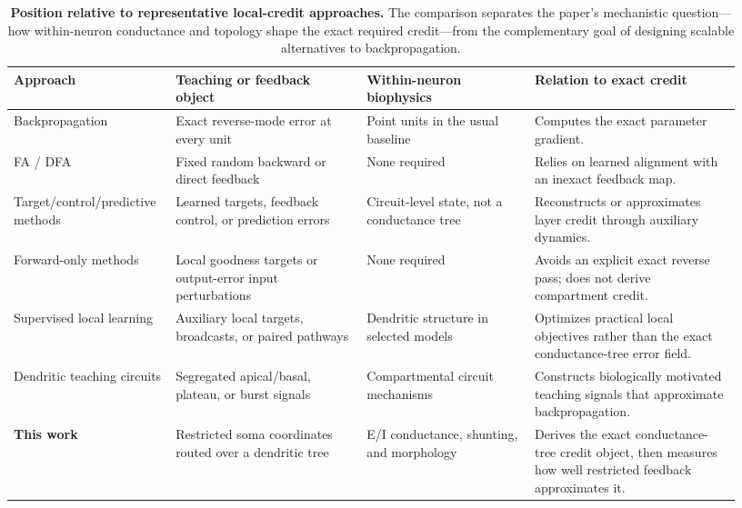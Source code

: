     \begin{table}[htbp]
    \centering
    \scriptsize
    \setlength{\tabcolsep}{2.5pt}
    \renewcommand{\arraystretch}{1.05}
    \begin{tabular}{@{}L{0.19\linewidth}L{0.25\linewidth}L{0.22\linewidth}L{0.27\linewidth}@{}}
    \toprule
    \textbf{Approach} & \textbf{Teaching or feedback object} & \textbf{Within-neuron biophysics} & \textbf{Relation to exact credit} \\
    \midrule
    Backpropagation \cite{rumelhart1986learning} & Exact reverse-mode error at every unit & Point units in the usual baseline & Computes the exact parameter gradient. \\
    FA / DFA \cite{lillicrap2016random,nokland2016dfa} & Fixed random backward or direct feedback & None required & Relies on learned alignment with an inexact feedback map. \\
    Target/control/predictive methods \cite{lee2015dtp,meulemans2021dfc,millidge2021predictive} & Learned targets, feedback control, or prediction errors & Circuit-level state, not a conductance tree & Reconstructs or approximates layer credit through auxiliary dynamics. \\
    Forward-only methods \cite{hinton2022forward,dellaferrera2022pepita} & Local goodness targets or output-error input perturbations & None required & Avoids an explicit exact reverse pass; does not derive compartment credit. \\
    Supervised local learning \cite{ma2024auglocal,lv2025dll,erdogan2025ebd,kao2024ccl} & Auxiliary local targets, broadcasts, or paired pathways & Dendritic structure in selected models & Optimizes practical local objectives rather than the exact conductance-tree error field. \\
    Dendritic teaching circuits \cite{guerguiev2017segregated,sacramento2018dendritic,payeur2021burst,greedy2022burstccn} & Segregated apical/basal, plateau, or burst signals & Compartmental circuit mechanisms & Constructs biologically motivated teaching signals that approximate backpropagation. \\
    \textbf{This work} & Restricted soma coordinates routed over a dendritic tree & E/I conductance, shunting, and morphology & Derives the exact conductance-tree credit object, then measures how well restricted feedback approximates it. \\
    \bottomrule
    \end{tabular}
    \caption{\textbf{Position relative to representative local-credit approaches.} The comparison separates the paper's mechanistic question---how within-neuron conductance and topology shape the exact required credit---from the complementary goal of designing scalable alternatives to backpropagation.}
    \label{tab:related_local_learning}
    \end{table}
    
